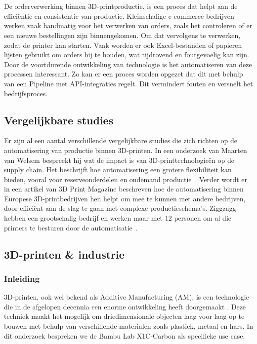 \chapter{}%
\label{ch:stand-van-zaken}

De orderverwerking binnen 3D-printproductie, is een proces dat helpt aan de efficiëntie en consistentie van productie. Kleinschalige e-\-commerce bedrijven werken vaak handmatig voor het verwerken van orders, zoals het controleren of er een nieuwe bestellingen zijn binnengekomen. Om dat vervolgens te verwerken, zodat de printer kan starten. Vaak worden er ook Excel-bestanden of papieren lijsten gebruikt om orders bij te houden, wat tijdrovend en foutgevoelig kan zijn. Door de voortdurende ontwikkeling van technologie is het automatiseren van deze processen interessant. Zo kan er een proces worden opgezet dat dit met behulp van een Pipeline met API-integraties regelt. Dit vermindert fouten en versnelt het bedrijfsproces. 

\section{Vergelijkbare studies}%
\label{sec:Vergelijkbare studie}

Er zijn al een aantal verschillende vergelijkbare studies die zich richten op de automatisering van productie binnen 3D-printen. In een onderzoek van Maarten van Welsem bespreekt hij wat de impact is van 3D-printtechnologieën op de supply chain. Het beschrijft hoe automatisering een grotere flexibiliteit kan bieden, vooral voor reserveonderdelen en ondemand productie~\autocite{emerce3DprintSupplyChain}. Verder wordt er in een artikel van 3D Print Magazine beschreven hoe de automatisering binnen Europese 3D-printbedrijven hen helpt om mee te kunnen met andere bedrijven, door efficiënt aan de slag te gaan met complexe productieschema's. Ziggzagg hebben een grootschalig bedrijf en werken maar met 12 personen om al die printers te besturen door de automatisatie~\autocite{3dprintmagAutomation}. 

\newpage

\section{3D-printen \& industrie}%
\label{sec:3D-printen & industrie}

\subsection{Inleiding}
3D-printen, ook wel bekend als Additive Manufacturing (AM), is een technologie die in de afgelopen decennia een enorme ontwikkeling heeft doorgemaakt \autocite{3dPrintingIndustry}. Deze techniek maakt het mogelijk om driedimensionale objecten laag voor laag op te bouwen met behulp van verschillende materialen zoals plastiek, metaal en hars. In dit onderzoek bespreken we de Bambu Lab X1C-Carbon als specifieke use case.

